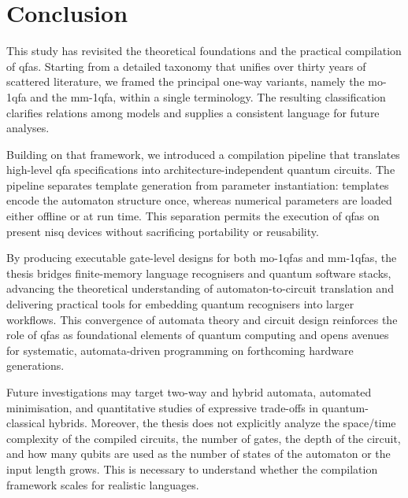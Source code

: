 \chapter{Conclusion}
\label{chap:conclusion}

This study has revisited the theoretical foundations and the practical compilation of \glspl{qfa}. Starting from a detailed taxonomy that unifies over thirty years of scattered literature, we framed the principal one-way variants, namely the \gls{mo-1qfa} and the \gls{mm-1qfa}, within a single terminology. The resulting classification clarifies relations among models and supplies a consistent language for future analyses.

Building on that framework, we introduced a compilation pipeline that translates high-level \gls{qfa} specifications into architecture-independent quantum circuits. The pipeline separates template generation from parameter instantiation: templates encode the automaton structure once, whereas numerical parameters are loaded either offline or at run time. This separation permits the execution of \glspl{qfa} on present \gls{nisq} devices without sacrificing portability or reusability.

By producing executable gate-level designs for both \glspl{mo-1qfa} and \glspl{mm-1qfa}, the thesis bridges finite-memory language recognisers and quantum software stacks, advancing the theoretical understanding of automaton-to-circuit translation and delivering practical tools for embedding quantum recognisers into larger workflows. This convergence of automata theory and circuit design reinforces the role of \glspl{qfa} as foundational elements of quantum computing and opens avenues for systematic, automata-driven programming on forthcoming hardware generations.


Future investigations may target two-way and hybrid automata, automated minimisation, and quantitative studies of expressive trade-offs in quantum-classical hybrids. Moreover, the thesis does not explicitly analyze the space/time complexity of the compiled circuits, the number of gates, the depth of the circuit, and how many qubits are used as the number of states of the automaton or the input length grows. This is necessary to understand whether the compilation framework scales for realistic languages. 

